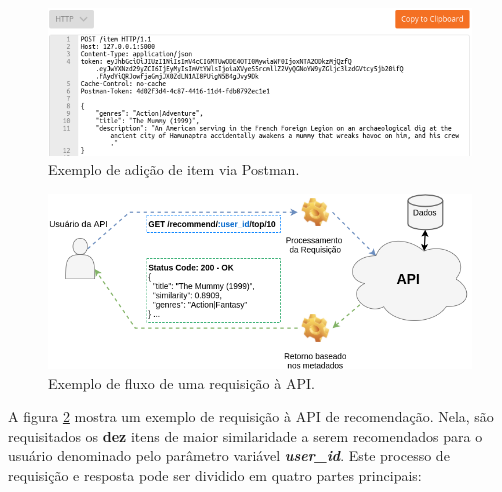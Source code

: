 \documentclass[12pt, openright, oneside, a4paper, brazil]{abntex2}
\begin{document}
\begin{figure}[htp]
	\caption{\label{postman}Exemplo de adição de item via Postman.}
	\begin{center}
		\includegraphics[scale=0.85]{images/postman.png}
	\end{center}
	\hspace{5.5cm}{Fonte: O Autor.}
\end{figure}

\begin{figure}[htp]
	\caption{\label{interconnection}Exemplo de fluxo de uma requisição à API.}
	\begin{center}
		\includegraphics[scale=0.62]{images/interconnection.png}
	\end{center}
	\hspace{5.5cm}{Fonte: O Autor.}
\end{figure}

A figura \ref{interconnection} mostra um exemplo de requisição à API de recomendação. Nela, são requisitados os \textbf{dez} itens de maior similaridade a serem recomendados para o usuário denominado pelo parâmetro variável \textbf{\textit{user\_id}}. Este processo de requisição e resposta pode ser dividido em quatro partes principais:
\end{document}
